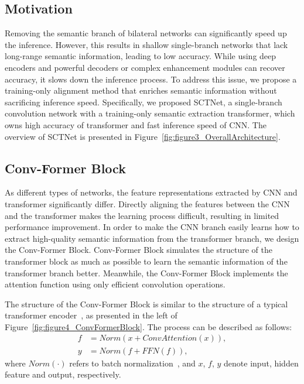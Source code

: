 \documentclass[letterpaper]{article} %
\begin{document}
\subsection{Motivation}


Removing the semantic branch of bilateral networks can significantly speed up the inference. However, this results in shallow single-branch networks that lack long-range semantic information, leading to low accuracy. While using deep encoders and powerful decoders or complex enhancement modules can recover accuracy, it slows down the inference process. To address this issue, we propose a training-only alignment method that enriches semantic information without sacrificing inference speed. Specifically, we proposed SCTNet, a single-branch convolution network with a training-only semantic extraction transformer, which owns high accuracy of transformer and fast inference speed of CNN. The overview of SCTNet is presented in Figure~\ref{fig:figure3_OverallArchitecture}.



\subsection{Conv-Former Block}
As different types of networks, the feature representations extracted by CNN and transformer significantly differ. Directly aligning the features between the CNN and the transformer makes the learning process difficult, resulting in limited performance improvement. In order to make the CNN branch easily learns how to extract high-quality semantic information from the transformer branch, we design the Conv-Former Block. Conv-Former Block simulates the structure of the transformer block as much as possible to learn the semantic information of the transformer branch better. Meanwhile, the Conv-Former Block implements the attention function using only efficient convolution operations.

The structure of the Conv-Former Block is similar to the structure of a typical transformer encoder~\cite{vaswani2017attention}, as presented in the left of Figure~\ref{fig:figure4_ConvFormerBlock}.
The process can be described as follows:
\begin{equation}
\label{Equ:ConvFormerBlock}
\begin{aligned}
f &= Norm(x + ConvAttention(x)),\\
y &= Norm (f + FFN(f)),
\end{aligned}
\end{equation}
where $Norm(\cdot)$ refers to  batch normalization~\cite{ioffe2015batch}, and $x$, $f$, $y$ denote input, hidden feature and output, respectively.
\end{document}
